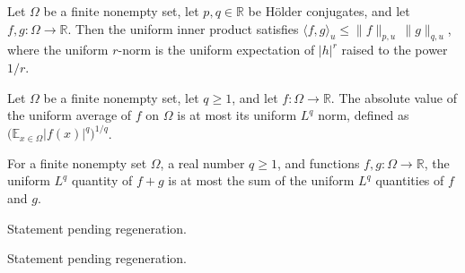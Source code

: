 \begin{theorem}
\label{FABL.uniformInner_le_uniformLpNorm_mul}
\leanok
{}
Let $\Omega$ be a finite nonempty set, let $p,q\in\mathbb R$ be Hölder conjugates, and
let $f,g:\Omega\to\mathbb R$. Then the uniform inner product satisfies $\langle
f,g\rangle_u\leq \|f\|_{p,u}\,\|g\|_{q,u}$, where the uniform $r$-norm is the uniform
expectation of $|h|^r$ raised to the power $1/r$.
\end{theorem}

\begin{theorem}
\label{FABL.abs_expect_le_uniformLpNorm}
\leanok
{}
Let $\Omega$ be a finite nonempty set, let $q\geq1$, and let
$f\colon\Omega\to\mathbb{R}$. The absolute value of the uniform average of $f$ on
$\Omega$ is at most its uniform $L^q$ norm, defined as
$\bigl(\mathbb{E}_{x\in\Omega}|f(x)|^q\bigr)^{1/q}$.
\end{theorem}

\begin{theorem}
\label{FABL.uniformLpNorm_add_le}
\leanok
{}
For a finite nonempty set $\Omega$, a real number $q\ge 1$, and functions
$f,g:\Omega\to\mathbb{R}$, the uniform $L^q$ quantity of $f+g$ is at most the sum of the
uniform $L^q$ quantities of $f$ and $g$.
\end{theorem}

\begin{theorem}
\label{FABL.meanZero_qq_hypercontractive_real}
\leanok
{}
Statement pending regeneration.
\end{theorem}

\begin{theorem}
\label{FABL.meanZero_qq_hypercontractive}
\leanok
{}
Statement pending regeneration.
\end{theorem}

